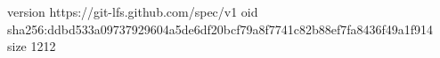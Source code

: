 version https://git-lfs.github.com/spec/v1
oid sha256:ddbd533a09737929604a5de6df20bcf79a8f7741c82b88ef7fa8436f49a1f914
size 1212
